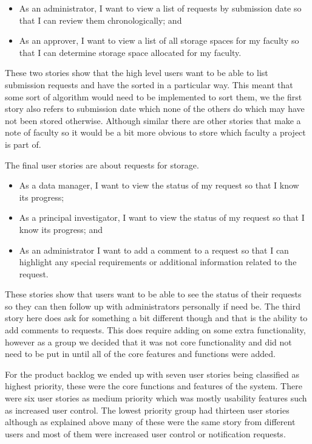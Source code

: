 \documentclass[a4paper,titlepage,12pt]{article}
\begin{document}
\begin{itemize}
	\item As an administrator, I want to view a list of requests by
	      submission date so that I can review them chronologically; and
	\item As an approver, I want to view a list of all storage spaces for
	      my faculty so that I can determine storage space allocated for my
	      faculty.
\end{itemize}

These two stories show that the high level users want to be able to list
submission requests and have the sorted in a particular way. This meant that
some sort of algorithm would need to be implemented to sort them, we the first
story also refers to submission date which none of the others do which may have
not been stored otherwise. Although similar there are other stories that make a
note of faculty so it would be a bit more obvious to store which faculty a
project is part of.

The final user stories are about requests for storage.

\begin{itemize}
	\item As a data manager, I want to view the status of my request so
	      that I know its progress;
	\item As a principal investigator, I want to view the status of my
	      request so that I know its progress; and
	\item As an administrator I want to add a comment to a request so that
	      I can highlight any special requirements or additional
	      information related to the request.
\end{itemize}

These stories show that users want to be able to see the status of their
requests so they can then follow up with administrators personally if need be.
The third story here does ask for something a bit different though and that is
the ability to add comments to requests. This does require adding on some extra
functionality, however as a group we decided that it was not core functionality
and did not need to be put in until all of the core features and functions were
added.

For the product backlog we ended up with seven user stories being classified as
highest priority, these were the core functions and features of the system.
There were six user stories as medium priority which was mostly usability
features such as increased user control. The lowest priority group had thirteen
user stories although as explained above many of these were the same story from
different users and most of them were increased user control or notification
requests.
\end{document}

